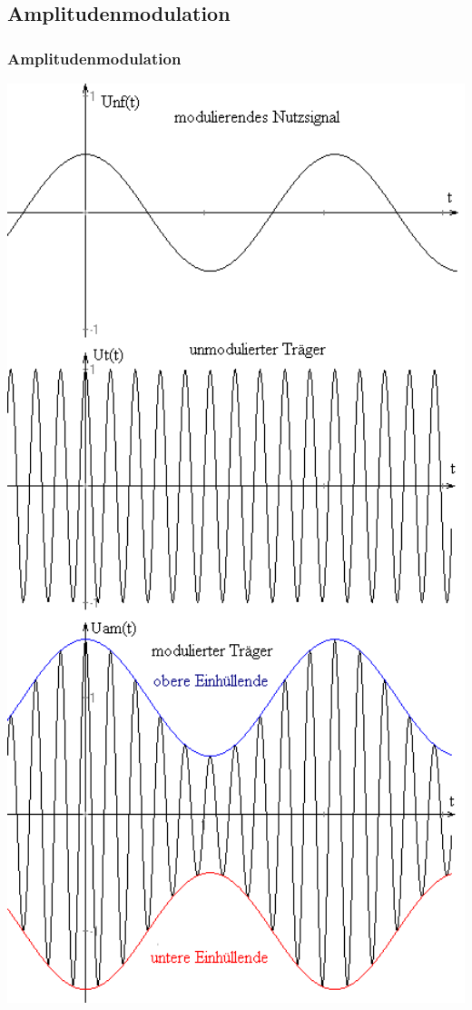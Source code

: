 \subsection[AM]{Amplitudenmodulation}
\begin{frame}
\frametitle{Amplitudenmodulation}
\begin{minipage}{0.3\textwidth}
\includegraphics[width=1\textwidth]{e14/AM1.png}\\

\end{minipage}
\end{frame}
